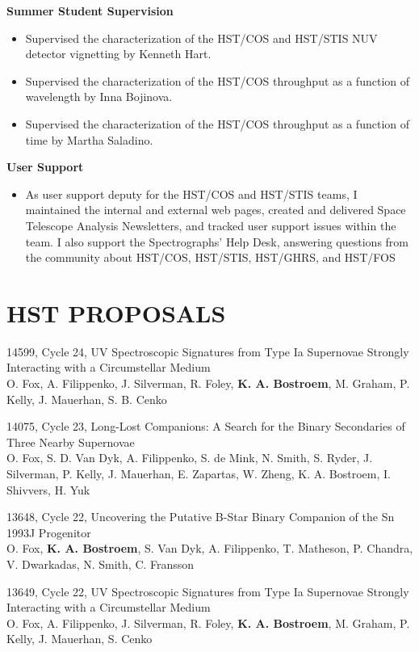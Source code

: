 \documentclass{res}
\begin{document}
\begin{resume}
	{\bf Summer Student Supervision}
		\begin{itemize}
		\item[]  Supervised the characterization of the HST/COS and HST/STIS NUV detector vignetting by Kenneth Hart.
		\item[]  Supervised the characterization of the HST/COS throughput as a function of wavelength by Inna Bojinova.
		\item[]  Supervised the characterization of the HST/COS throughput as a function of time by Martha Saladino.
		\end{itemize}

   {\bf  User Support}
   		\begin{itemize}
		\item[] As user support deputy for the HST/COS and HST/STIS teams, I maintained the internal and external web pages, created and delivered Space Telescope Analysis Newsletters, and tracked user support issues within the team. I also support the Spectrographs' Help Desk, answering questions from the community about HST/COS, HST/STIS, HST/GHRS, and HST/FOS
		\end{itemize}
	

\section{HST PROPOSALS}
14599, Cycle 24, UV Spectroscopic Signatures from Type Ia Supernovae Strongly Interacting with a Circumstellar Medium\\
O. Fox, A. Filippenko, J. Silverman, R. Foley, {\bf K. A. Bostroem}, M. Graham, P. Kelly, J. Mauerhan, S. B. Cenko

14075, Cycle 23, Long-Lost Companions: A Search for the Binary Secondaries of Three Nearby Supernovae \\
O. Fox, S. D. Van Dyk,  A. Filippenko, S. de Mink, N. Smith, S. Ryder, J. Silverman, P. Kelly, J. Mauerhan, E. Zapartas, W. Zheng, K. A. Bostroem, I. Shivvers, H. Yuk           

13648, Cycle 22, Uncovering the Putative B-Star Binary Companion of the Sn 1993J Progenitor\\
O. Fox, {\bf K. A. Bostroem}, S. Van Dyk, A. Filippenko, T. Matheson, P. Chandra, V. Dwarkadas, N. Smith, C. Fransson 

13649, Cycle 22, UV Spectroscopic Signatures from Type Ia Supernovae Strongly Interacting with a Circumstellar Medium \\
O. Fox, A. Filippenko, J. Silverman, R. Foley, {\bf K. A. Bostroem}, M. Graham, P. Kelly, J. Mauerhan, S. Cenko


\end{resume}
\end{document}
